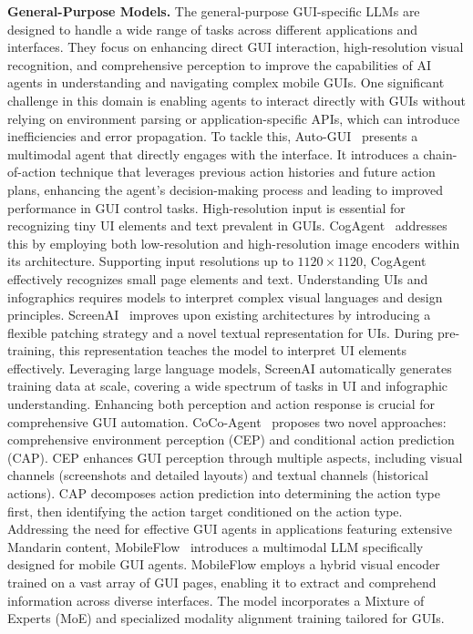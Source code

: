 \noindent\textbf{General-Purpose Models.}
The general-purpose GUI-specific LLMs are designed to handle a wide range of tasks across different applications and interfaces. They focus on enhancing direct GUI interaction, high-resolution visual recognition, and comprehensive perception to improve the capabilities of AI agents in understanding and navigating complex mobile GUIs.
One significant challenge in this domain is enabling agents to interact directly with GUIs without relying on environment parsing or application-specific APIs, which can introduce inefficiencies and error propagation. To tackle this, Auto-GUI~\cite{zhang2023youautoui} presents a multimodal agent that directly engages with the interface. It introduces a chain-of-action technique that leverages previous action histories and future action plans, enhancing the agent's decision-making process and leading to improved performance in GUI control tasks.
High-resolution input is essential for recognizing tiny UI elements and text prevalent in GUIs. CogAgent~\cite{hong2024cogagent} addresses this by employing both low-resolution and high-resolution image encoders within its architecture. Supporting input resolutions up to $1120 \times 1120$, CogAgent effectively recognizes small page elements and text.
Understanding UIs and infographics requires models to interpret complex visual languages and design principles. ScreenAI~\cite{baechler2024screenai} improves upon existing architectures by introducing a flexible patching strategy and a novel textual representation for UIs. During pre-training, this representation teaches the model to interpret UI elements effectively. Leveraging large language models, ScreenAI automatically generates training data at scale, covering a wide spectrum of tasks in UI and infographic understanding.
Enhancing both perception and action response is crucial for comprehensive GUI automation. CoCo-Agent~\cite{ma2024coco} proposes two novel approaches: comprehensive environment perception (CEP) and conditional action prediction (CAP). CEP enhances GUI perception through multiple aspects, including visual channels (screenshots and detailed layouts) and textual channels (historical actions). CAP decomposes action prediction into determining the action type first, then identifying the action target conditioned on the action type.
Addressing the need for effective GUI agents in applications featuring extensive Mandarin content, MobileFlow~\cite{nong2024mobileflow} introduces a multimodal LLM specifically designed for mobile GUI agents. MobileFlow employs a hybrid visual encoder trained on a vast array of GUI pages, enabling it to extract and comprehend information across diverse interfaces. The model incorporates a Mixture of Experts (MoE) and specialized modality alignment training tailored for GUIs.
